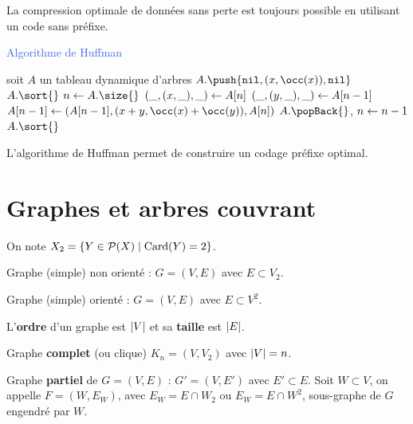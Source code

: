 \documentclass[a4paper,10pt,twocolumn]{article}
\begin{document}
	\begin{thm}
	La compression optimale de données sans perte est toujours possible en utilisant un code sans préfixe.
	\end{thm}


	\begin{algorithm}
	\caption{\textcolor{RoyalBlue}{Algorithme de Huffman}}
	soit $A$ un tableau dynamique d'arbres \;
	{
		$A.\push{\texttt{nil},(x,\occ(x)),\texttt{nil}}$\;
	}
	$A.\sort{}$ \;
	$n \lar A.\size{}$ \;
	{
		$(\_,(x,\_),\_) \leftarrow A[n]$ \;
		$(\_,(y,\_),\_) \leftarrow A[n - 1]$ \;
		$A[n - 1] \lar (A[n - 1],(x + y, \occ(x) + \occ(y)), A[n])$ \;
		$A.\popBack{}$, $n \leftarrow n - 1$ \;
		$A.\sort{}$ \;
	}
	\end{algorithm}

	\begin{thm}
	L'algorithme de Huffman permet de construire un codage préfixe optimal.
	\end{thm}


\section{Graphes et arbres couvrant}

	On note $X_2 = \{ Y \in \mathcal{P}(X) \mid \operatorname{Card}(Y) = 2 \}$.

	\begin{defn}
	Graphe (simple) non orienté : $G = (V,E)$ avec $E \subset V_2$.
	\end{defn}

	\begin{defn}
	Graphe (simple) orienté : $G = (V,E)$ avec $E \subset V^2$.
	\end{defn}

	\begin{defn}
	L'\textbf{ordre} d'un graphe est $\left\lvert V\right\rvert$ et sa \textbf{taille} est $\left\lvert E\right\rvert$.
	\end{defn}

	\begin{defn}
	Graphe \textbf{complet} (ou clique) $K_n = (V,V_2)$ avec $\left\lvert V\right\rvert = n$.
	\end{defn}

	\begin{defn}
	Graphe \textbf{partiel} de $G = (V,E)$ : $G' = (V,E')$ avec $E' \subset E$.
	Soit $W \subset V$, on appelle $F = (W,E_W)$, avec $E_W = E \cap W_2$ ou $E_W = E \cap W^2$, sous-graphe de $G$ engendré par $W$.
	\end{defn}
\end{document}
